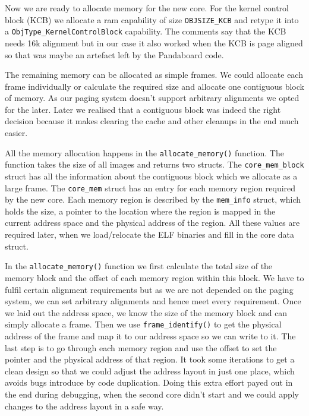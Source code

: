 Now we are ready to allocate memory for the new core. For the kernel control block (KCB)
we allocate a ram capability of size \verb|OBJSIZE_KCB| and retype it into a
\verb|ObjType_KernelControlBlock| capability. The comments say that the KCB needs 16k
alignment but in our case it also worked when the KCB is page aligned so that was maybe an
artefact left by the Pandaboard code.

The remaining memory can be allocated as simple frames.
We could allocate each frame individually or calculate the required size and allocate one
contiguous block of memory. As our paging system doesn't support arbitrary alignments we opted
for the later. Later we realised that a contiguous block was indeed the right decision because
it makes clearing the cache and other cleanups in the end much easier.

All the memory allocation happens in the \verb|allocate_memory()| function. The function takes
the size of all images and returns two structs. The \verb|core_mem_block| struct has all the
information about the contiguous block which we allocate as a large frame. The \verb|core_mem|
struct has an entry for each memory region required by the new core. Each memory region is
described by the \verb|mem_info| struct, which holds the size, a pointer to the location where
the region is mapped in the current address space and the physical address of the region. All these
values are required later, when we load/relocate the ELF binaries and fill in the core data struct.

In the \verb|allocate_memory()| function we first calculate the total size of the memory block and
the offset of each memory region within this block. We have to fulfil certain alignment requirements
but as we are not depended on the paging system, we can set arbitrary alignments and hence meet
every requirement. Once we laid out the address space, we know the size of the memory block and can
simply allocate a frame. Then we use \verb|frame_identify()| to get the physical address of the frame
and map it to our address space so we can write to it. The last step is to go through each memory region
and use the offset to set the pointer and the physical address of that region. It took some iterations
to get a clean design so that we could adjust the address layout in just one place, which avoids bugs
introduce by code duplication. Doing this extra effort payed out in the end during debugging, when the
second core didn't start and we could apply changes to the address layout in a safe way.

